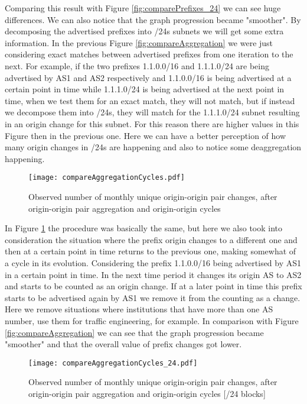 \documentclass[11pt,a4paper]{scrreprt}
\begin{document}
Comparing this result with Figure \ref{fig:comparePrefixes_24} we can see huge differences. We can also notice that the graph progression became "smoother". By decomposing the advertised prefixes into /24s subnets we will get some extra information. In the previous Figure \ref{fig:compareAggregation} we were just considering exact matches between advertised prefixes from one iteration to the next. For example, if the two prefixes 1.1.0.0/16 and 1.1.1.0/24 are being advertised by AS1 and AS2 respectively and 1.1.0.0/16 is being advertised at a certain point in time while 1.1.1.0/24 is being advertised at the next point in time, when we test them for an exact match, they will not match, but if instead we decompose them into /24s, they will match for the 1.1.1.0/24 subnet resulting in an origin change for this subnet. For this reason there are higher values in this Figure then in the previous one. Here we can have a better perception of how many origin changes in /24s are happening and also to notice some deaggregation happening.  



\begin{figure}[!h]
\centering
\texttt{[image: compareAggregationCycles.pdf]}
\caption{Observed number of monthly
unique origin-origin pair changes, after origin-origin pair aggregation and origin-origin cycles}
\label{fig:compareAggregationCycles}
\end{figure}

In Figure \ref{fig:compareAggregationCycles} the procedure was basically the same, but here we also took into consideration the situation where the prefix origin changes to a different one and then at a certain point in time returns to the previous one, making somewhat of a cycle in its evolution. Considering the prefix 1.1.0.0/16 being advertised by AS1 in a certain point in time. In the next time period it changes its origin AS to AS2 and starts to be counted as an origin change. If at a later point in time this prefix starts to be advertised again by AS1 we remove it from the counting as a change. Here we remove situations where institutions that have more than one AS number, use them for traffic engineering, for example.  In comparison with Figure \ref{fig:compareAggregation} we can see that the graph progression became "smoother" and that the overall value of prefix changes got lower.

\begin{figure}[!h]
\centering
\texttt{[image: compareAggregationCycles\_24.pdf]}
\caption{Observed number of monthly
unique origin-origin pair changes, after origin-origin pair aggregation and origin-origin cycles [/24 blocks]}
\label{fig:compareAggregationCycles24}
\end{figure}
\end{document}
